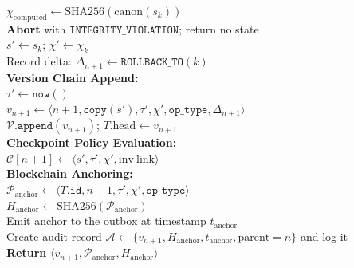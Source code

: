 \documentclass[final,5p,times,twocolumn]{elsarticle}
\begin{document}
\begin{algorithm}[!htbp]
{    $\chi_{\text{computed}} \leftarrow \mathrm{SHA256}(\mathrm{canon}(s_k))$ \\
     {
        \textbf{Abort} with $\mathtt{INTEGRITY\_VIOLATION}$; return no state \\
    }
    \BlankLine
    $s' \leftarrow s_k$; \quad $\chi' \leftarrow \chi_k$ \\
    Record delta: $\Delta_{n+1} \leftarrow \mathtt{ROLLBACK\_TO}(k)$ \\
}
\BlankLine
\textbf{Version Chain Append:} \\
$\tau' \leftarrow \mathtt{now}()$ \\
$v_{n+1} \leftarrow \langle n{+}1, \mathtt{copy}(s'), \tau', \chi', \mathtt{op\_type}, \Delta_{n+1} \rangle$ \\
$\mathcal{V}.\mathtt{append}(v_{n+1})$; \quad $T.\text{head} \leftarrow v_{n+1}$ \\
\BlankLine
\textbf{Checkpoint Policy Evaluation:} \\
 {
    $\mathcal{C}[n{+}1] \leftarrow \langle s', \tau', \chi', \mathrm{inv\ link}\rangle$ \\
}
\BlankLine
\textbf{Blockchain Anchoring:} \\
$\mathcal{P}_{\text{anchor}} \leftarrow \langle T.\texttt{id}, n{+}1, \tau', \chi', \mathtt{op\_type} \rangle$ \\
$H_{\text{anchor}} \leftarrow \mathrm{SHA256}(\mathcal{P}_{\text{anchor}})$ \\
Emit anchor to the outbox at timestamp $t_{\text{anchor}}$ \\
\BlankLine
Create audit record $\mathcal{A} \leftarrow \{v_{n+1}, H_{\text{anchor}}, t_{\text{anchor}}, \text{parent}=n\}$ and log it \\
\textbf{Return} $\langle v_{n+1}, \mathcal{P}_{\text{anchor}}, H_{\text{anchor}} \rangle$ \\
\end{algorithm}
\end{document}

